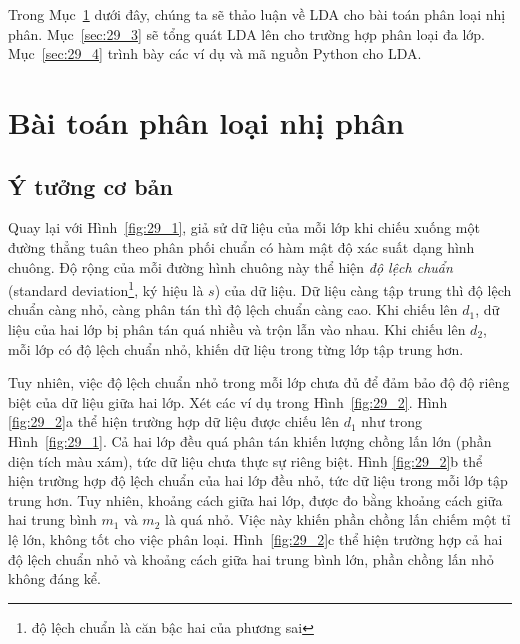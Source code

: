 Trong Mục~\ref{sec:29_2} dưới đây, chúng ta sẽ thảo luận về LDA cho bài toán
phân loại nhị phân. Mục~\ref{sec:29_3} sẽ tổng quát LDA lên cho trường hợp phân
loại đa lớp. Mục~\ref{sec:29_4} trình bày các ví dụ và mã nguồn Python cho LDA.


\section{Bài toán phân loại nhị phân}
\label{sec:29_2}
\subsection{Ý tưởng cơ bản}
Quay lại với Hình~\ref{fig:29_1}, giả sử dữ liệu của mỗi lớp khi chiếu
xuống một đường thẳng tuân theo phân phối chuẩn có hàm mật độ xác suất dạng hình chuông. Độ rộng của mỗi đường hình chuông này thể hiện \textit{độ lệch
chuẩn} ({standard deviation}\footnote{độ lệch chuẩn là căn bậc hai của
phương sai}, ký hiệu là $s$) của dữ liệu. Dữ liệu càng tập trung thì độ lệch
chuẩn càng nhỏ,
càng phân tán thì độ lệch chuẩn càng cao. Khi chiếu lên $d_1$, dữ liệu của
hai lớp bị phân tán quá nhiều và trộn lẫn vào nhau. Khi chiếu lên $d_2$, mỗi lớp
có độ lệch chuẩn nhỏ, khiến dữ liệu trong từng
lớp tập trung hơn.


Tuy nhiên, việc độ lệch chuẩn nhỏ trong mỗi lớp chưa đủ để đảm bảo độ độ riêng
biệt của dữ liệu giữa hai lớp. Xét các ví dụ trong
Hình~\ref{fig:29_2}. Hình \ref{fig:29_2}a thể hiện trường hợp
dữ liệu được chiếu lên $d_1$ như trong Hình~\ref{fig:29_1}. Cả hai lớp đều quá
phân
tán khiến lượng chồng lấn lớn (phần diện tích màu xám), tức dữ liệu chưa
thực sự riêng biệt. Hình \ref{fig:29_2}b thể hiện trường hợp độ lệch
chuẩn của hai lớp đều nhỏ, tức dữ liệu trong mỗi lớp tập trung hơn. Tuy nhiên, khoảng cách giữa hai lớp, được đo bằng khoảng cách
giữa hai trung bình $m_1$ và $m_2$ là quá nhỏ. Việc này khiến phần chồng lấn chiếm
một tỉ lệ lớn, không tốt cho việc phân loại.
Hình~\ref{fig:29_2}c thể hiện trường hợp cả hai độ lệch chuẩn nhỏ và khoảng
cách giữa hai trung bình lớn, phần chồng lấn nhỏ không đáng kể.

